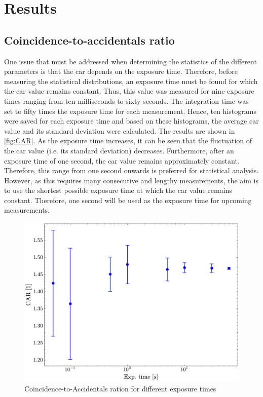 \section{Results}

\subsection{Coincidence-to-accidentals ratio}
One issue that must be addressed when determining the statistics of the different parameters is that the \acrfull{car} depends on the exposure time. Therefore, before measuring the statistical distributions, an exposure time must be found for which the \acrshort{car} value remains constant. Thus, this value was measured for nine exposure times ranging from ten milliseconds to sixty seconds. The integration time was set to fifty times the exposure time for each measurement. Hence, ten histograms were saved for each exposure time and based on these histograms, the average \acrshort{car} value and its standard deviation were calculated. \newline
The results are shown in \autoref{fig:CAR}. As the exposure time increases, it can be seen that the fluctuation of the \acrshort{car} value (i.e. its standard deviation) decreases. Furthermore, after an exposure time of one second, the \acrshort{car} value remains approximately constant. Therefore, this range from one second onwards is preferred for statistical analysis. However, as this requires many consecutive and lengthy measurements, the aim is to use the shortest possible exposure time at which the \acrshort{car} value remains constant. Therefore, one second will be used as the exposure time for upcoming measurements.
\begin{figure}[bt!]
	\centering
	\includegraphics[width=.7\textwidth]{Images/CAR_Ratio.pdf}
	\caption{Coincidence-to-Accidentals ration for different exposure times}
	\label{fig:CAR}
\end{figure}
